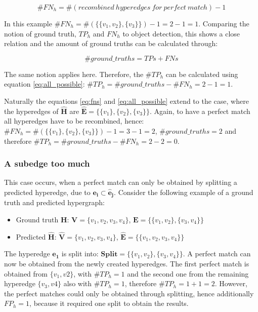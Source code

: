 \begin{equation}
    \#FN_h = \#(recombined\ hyperedges\ for\ perfect\ match) - 1
    \label{eq:fns}
\end{equation}

In this example $\#FN_h = \#(\{\{v_1, v_2\}, \{v_3\}\}) - 1 = 2 - 1 = 1$.
Comparing the notion of ground truth, $TP_h$ and $FN_h$ to object detection, this shows a close relation and the amount of ground truths can be calculated through:

\begin{equation}
    \#ground\_truths = TPs + FNs
    \label{eq:all_possible}
\end{equation}

The same notion applies here.
Therefore, the $\#TP_h$ can be calculated using equation \ref{eq:all_possible}:
$\#TP_h = \#ground\_truths - \#FN_h = 2 - 1 = 1$.

Naturally the equations \ref{eq:fns} and \ref{eq:all_possible} extend to the case, where the hyperedges of $\mathbf{\hat{H}}$ are $\mathbf{\hat{E}} = \{\{v_1\}, \{v_2\}, \{v_3\}\}$.
Again, to have a perfect match all hyperedges have to be recombined, hence: $\#FN_h = \#(\{\{v_1\}, \{v_2\}, \{v_3\}\}) - 1 = 3 - 1 = 2$, $\#ground\_truths = 2$ and therefore $\#TP_h = \#ground\_truths - \#FN_h = 2 - 2 = 0$.

\subsubsection{A subedge too much}
This case occurs, when a perfect match can only be obtained by splitting a predicted hyperedge, due to $\mathbf{e_i} \subset \mathbf{\hat{e}_j}$.
Consider the following example of a ground truth and predicted hypergraph:

\begin{itemize}
    \item Ground truth $\mathbf{H}$: $\mathbf{V} = \{v_1, v_2, v_3, v_4\}$, $\mathbf{E} = \{\{v_1, v_2\}, \{v_3, v_4\}\}$
    \item Predicted $\mathbf{\hat{H}}$: $\mathbf{\hat{V}} = \{v_1, v_2, v_3, v_4\}$, $\mathbf{\hat{E}} = \{\{v_1, v_2, v_3, v_4\}\}$
\end{itemize}

The hyperedge $\mathbf{\hat{e}_1}$ is split into: $\mathbf{Split} = \{\{v_1, v_2\}, \{v_3, v_4\}\}$.
A perfect match can now be obtained from the newly created hyperedges.
The first perfect match is obtained from $\{v_1, v2\}$, with $\#TP_h = 1$ and the second one from the remaining hyperedge $\{v_3, v4\}$ also with $\#TP_h = 1$, therefore $\#TP_h = 1 + 1 = 2$.
However, the perfect matches could only be obtained through splitting, hence additionally $FP_h = 1$, because it required one split to obtain the results.

